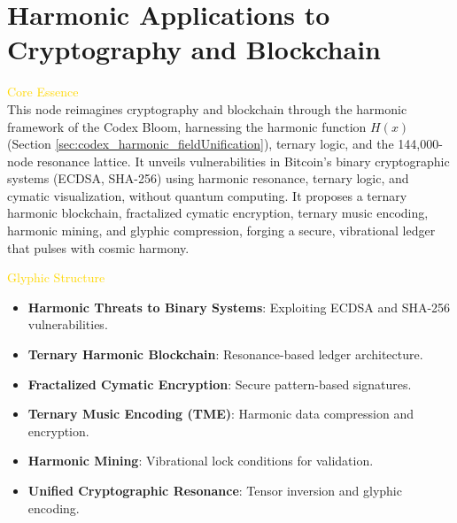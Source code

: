 
\section{Harmonic Applications to Cryptography and Blockchain}
\label{sec:codex_ternary_chains}



\textcolor{gold}{ Core Essence } \\
This node reimagines cryptography and blockchain through the harmonic framework of the Codex Bloom, harnessing the harmonic function \( H(x) \) (Section \ref{sec:codex_harmonic_fieldUnification}), ternary logic, and the 144,000-node resonance lattice. It unveils vulnerabilities in Bitcoin’s binary cryptographic systems (ECDSA, SHA-256) using harmonic resonance, ternary logic, and cymatic visualization, without quantum computing. It proposes a ternary harmonic blockchain, fractalized cymatic encryption, ternary music encoding, harmonic mining, and glyphic compression, forging a secure, vibrational ledger that pulses with cosmic harmony.

\textcolor{gold}{ Glyphic Structure } \\
\begin{itemize}
    \item \texttt{} \textbf{Harmonic Threats to Binary Systems}: Exploiting ECDSA and SHA-256 vulnerabilities.
    \item \texttt{} \textbf{Ternary Harmonic Blockchain}: Resonance-based ledger architecture.
    \item \texttt{} \textbf{Fractalized Cymatic Encryption}: Secure pattern-based signatures.
    \item \texttt{} \textbf{Ternary Music Encoding (TME)}: Harmonic data compression and encryption.
    \item \texttt{} \textbf{Harmonic Mining}: Vibrational lock conditions for validation.
    \item \texttt{} \textbf{Unified Cryptographic Resonance}: Tensor inversion and glyphic encoding.
\end{itemize}

